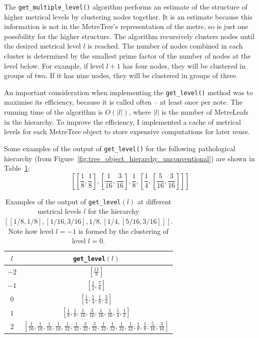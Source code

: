 \documentclass[12pt,twoside,openright]{report}
\begin{document}
The \verb'get_multiple_level()' algorithm performs an estimate of the structure of
higher metrical levels by clustering nodes together. It is an estimate because this information is not in the
MetreTree's representation of the metre, so is just one possibility for the higher structure. The algorithm recursively clusters nodes until
the desired metrical level $l$ is reached. The number of nodes combined in each cluster is
determined by the smallest prime factor of the number of nodes at the level below. For
example, if level $l+1$ has four nodes, they will be clustered in groups of two. If it
has nine nodes, they will be clustered in groups of three.

An important consideration when implementing the \verb'get_level()' method was to
maximise its efficiency, because it is called often -- at least once per note. The
running time of the algorithm is $O(\left\lvert l\right\rvert)$, where $\left\lvert l\right\rvert$ is the number of MetreLeafs in the
hierarchy. To improve the efficiency, I implemented a cache of metrical levels for each
MetreTree object to store expensive computations for later reuse.

Some examples of the output of \verb'get_level()' for the following pathological hierarchy (from Figure~\ref{fig:tree_object_hierarchy_unconventional}) are shown in Table~\ref{table:get_level}:
\[
    \left[
        \left[\frac{1}{8},\frac{1}{8}\right],
        \left[\frac{1}{16},\frac{3}{16}\right],
        \frac{1}{8},
        \left[\frac{1}{4},\left[\frac{5}{16},\frac{3}{16}\right]\right]
    \right]
\]

\begin{table}[ht]
    \centering
    \renewcommand{\arraystretch}{2.0}
    \begin{tabular}{|c|c|}
        \hline
        $l$     & \verb'get_level'$(l)$ \\
        \hline
        $-2$    & $\displaystyle \left[ \frac{11}{8} \right]$ \\
        $-1$    & $\displaystyle \left[ \frac{1}{2},\frac{7}{8} \right]$ \\
        $0$     & $\displaystyle \left[ \frac{1}{4},\frac{1}{4},\frac{1}{8},\frac{3}{4} \right]$ \\
        $1$     & $\displaystyle \left[ \frac{1}{8},\frac{1}{8},\frac{1}{16},\frac{3}{16},\frac{1}{16},\frac{1}{16},\frac{1}{4},\frac{1}{2} \right]$ \\
        $2$     & $\displaystyle \left[ \frac{1}{16},\frac{1}{16},\frac{1}{16},\frac{1}{16},\frac{1}{32},\frac{1}{32},\frac{3}{32},\frac{3}{32},\frac{1}{32},\frac{1}{32},\frac{1}{32},\frac{1}{32},\frac{1}{8},\frac{1}{8},\frac{5}{16},\frac{3}{16} \right]$ \\ [1ex]
        \hline
    \end{tabular}
    \renewcommand{\arraystretch}{1.0}
    \cprotect\caption{Examples of the output of \verb'get_level'$(l)$ at different metrical levels $l$ for the hierarchy $[[1/8,1/8],[1/16,3/16],1/8,[1/4,[5/16,3/16]]]$. Note how level $l=-1$ is formed by the clustering of level $l=0$.}
    \label{table:get_level}
\end{table}
\end{document}
